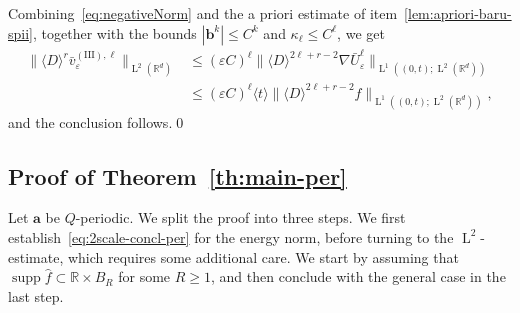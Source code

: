 \documentclass[JEP,XML,SOM,Unicode,published]{cedram}
\theoremstyle{plain}
\theoremstyle{definition}
\numberwithin{equation}{section}
\newcommand{\e}{\varepsilon}
\newcommand{\R}{\mathbb R}
\newcommand{\Aa}{\boldsymbol a}
\newcommand{\bb}{{\boldsymbol b}}
\newcommand{\Ld}{\operatorname{L}}
\newcommand{\supp}{\operatorname{supp}}
\begin{document}
Combining~{\eqref{eq:negativeNorm} and the a priori estimate of item~\eqref{lem:apriori-baru-spii}}, together with the bounds $|\bb^k|\le C^k$ and $\kappa_\ell\le C^\ell$, we get
\begin{align*}
\|\langle D\rangle^r\bar v_\e^{\operatorname{(III)},\ell}\|_{\Ld^2(\R^d)}
&\le (\e C)^\ell\|\langle D\rangle^{2\ell+r-2}\nabla\bar U_\e^\ell\|_{\Ld^1((0,t);\Ld^2(\R^d))}\\
&\le (\e C)^\ell\langle t\rangle\|\langle D\rangle^{2\ell+r-2}f\|_{\Ld^1((0,t);\Ld^2(\R^d))},
\end{align*}
and the conclusion follows.\qed

\subsection{Proof of Theorem~\ref{th:main-per}}
Let $\Aa$ be $Q$-periodic.
We split the proof into three steps. We first establish~\eqref{eq:2scale-concl-per} for the energy norm, before turning to the $\Ld^2$-estimate, which requires some additional care. We start by assuming that $\supp\hat f\subset \R\times B_R$ for some $R\ge1$, and then conclude with the general case in the last step.
\end{document}
